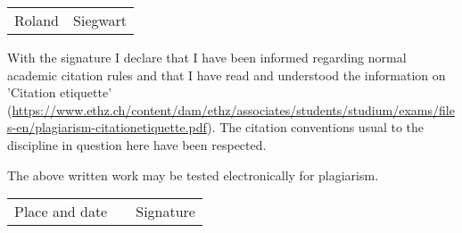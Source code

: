 \vspace{0.5cm}

\begin{tabular}{ p{5cm} p{5cm} }
  Roland & Siegwart \\
\end{tabular}

\vspace{1cm}

With the signature I declare that I have been informed regarding normal academic citation rules and that I have read and understood the information on 'Citation etiquette' (\url{https://www.ethz.ch/content/dam/ethz/associates/students/studium/exams/files-en/plagiarism-citationetiquette.pdf}). The citation conventions usual to the discipline in question here have been respected.

\vspace{0.5cm}

The above written work may be tested electronically for plagiarism.

\vspace{4cm}

\begin{tabular}{ p{5cm} p{1cm} p{5cm} }
  \cline{1-1} \cline{3-3}
  Place and date & & Signature \\
\end{tabular}